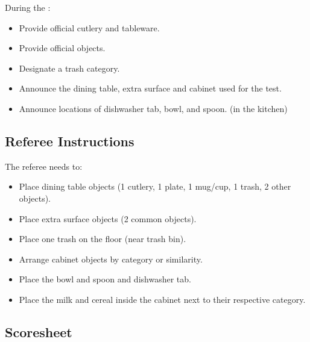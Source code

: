 During the \SetupDays:
\begin{itemize}
	\item Provide official cutlery and tableware.
	\item Provide official objects.
	\item Designate a trash category.
	\item Announce the dining table, extra surface and cabinet used for the test.
	\item Announce locations of dishwasher tab, bowl, and spoon. (in the kitchen)
\end{itemize}


\subsection*{Referee Instructions}

The referee needs to:
\begin{itemize}
	\item Place dining table objects (1 cutlery, 1 plate, 1 mug/cup, 1 trash, 2 other objects).
	\item Place extra surface objects (2 common objects).
	\item Place one trash on the floor (near trash bin).
	\item Arrange cabinet objects by category or similarity.
	\item Place the bowl and spoon and dishwasher tab.
	\item Place the milk and cereal inside the cabinet next to their respective category.
\end{itemize}

\subsection*{Scoresheet}


